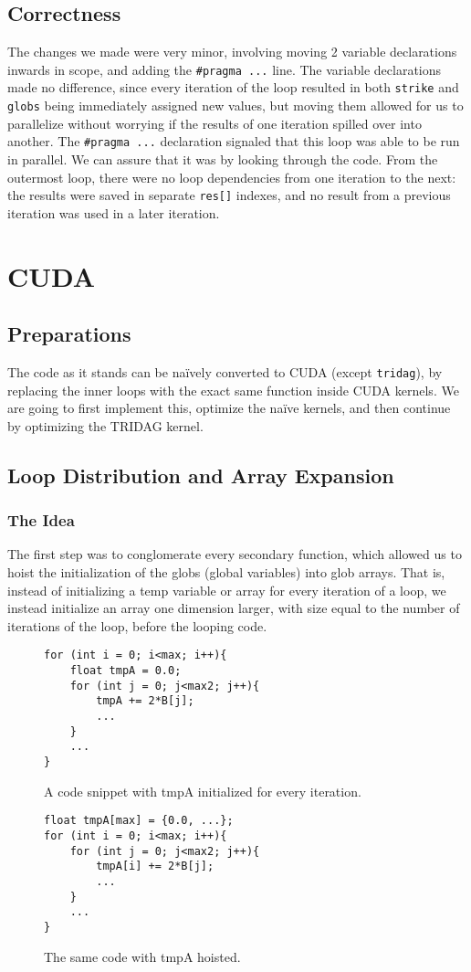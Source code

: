 \documentclass[12pt, oneside]{article}
\begin{document}
\subsection{Correctness}
The changes we made were very minor, involving moving 2 variable declarations inwards in scope, and adding the \texttt{\#pragma ...} line. The variable declarations made no difference, since every iteration of the loop resulted in both \texttt{strike} and \texttt{globs} being immediately assigned new values, but moving them allowed for us to parallelize without worrying if the results of one iteration spilled over into another. The \texttt{\#pragma ...} declaration signaled that this loop was able to be run in parallel. We can assure that it was by looking through the code. From the outermost loop, there were no loop dependencies from one iteration to the next: the results were saved in separate \texttt{res[]} indexes, and no result from a previous iteration was used in a later iteration.
\section{CUDA}
\subsection{Preparations}
The code as it stands can be na\"ively converted to CUDA (except \texttt{tridag}), by replacing the inner loops with the exact same function inside CUDA kernels. We are going to first implement this, optimize the na\"ive kernels, and then continue by optimizing the TRIDAG kernel.
\subsection{Loop Distribution and Array Expansion}
\subsubsection{The Idea}
The first step was to conglomerate every secondary function, which allowed us to hoist the initialization of the globs (global variables) into glob arrays. That is, instead of initializing a temp variable or array for every iteration of a loop, we instead initialize an array one dimension larger, with size equal to the number of iterations of the loop, before the looping code.
\begin{figure}[h]
	\begin{lstlisting}
for (int i = 0; i<max; i++){
	float tmpA = 0.0;
	for (int j = 0; j<max2; j++){
		tmpA += 2*B[j];
		...
	}
	...
}
	\end{lstlisting}
\caption{ \label{fig:nohoist} A code snippet with tmpA initialized for every iteration.}
\end{figure}
\begin{figure}[h]
	\begin{lstlisting}
float tmpA[max] = {0.0, ...};
for (int i = 0; i<max; i++){
	for (int j = 0; j<max2; j++){
		tmpA[i] += 2*B[j];
		...
	}
	...
}
\end{lstlisting}
\caption{ \label{fig:yeshoist} The same code with tmpA hoisted.}
\end{figure}
		
\end{document}
